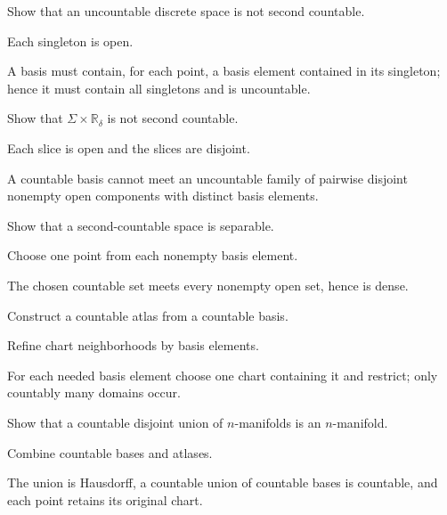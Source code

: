 \begin{exercise}\label{exr:vii01-09}
Show that an uncountable discrete space is not second countable.
\end{exercise}
\begin{hint}
Each singleton is open.
\end{hint}
\begin{solution}A basis must contain, for each point, a basis element contained in its singleton; hence it must contain all singletons and is uncountable.\end{solution}

\begin{exercise}\label{exr:vii01-10}
Show that \(\Sigma\times\mathbb R_\delta\) is not second countable.
\end{exercise}
\begin{hint}
Each slice is open and the slices are disjoint.
\end{hint}
\begin{solution}A countable basis cannot meet an uncountable family of pairwise disjoint nonempty open components with distinct basis elements.\end{solution}

\begin{exercise}\label{exr:vii01-11}
Show that a second-countable space is separable.
\end{exercise}
\begin{hint}
Choose one point from each nonempty basis element.
\end{hint}
\begin{solution}The chosen countable set meets every nonempty open set, hence is dense.\end{solution}

\begin{exercise}\label{exr:vii01-12}
Construct a countable atlas from a countable basis.
\end{exercise}
\begin{hint}
Refine chart neighborhoods by basis elements.
\end{hint}
\begin{solution}For each needed basis element choose one chart containing it and restrict; only countably many domains occur.\end{solution}

\begin{exercise}\label{exr:vii01-13}
Show that a countable disjoint union of \(n\)-manifolds is an \(n\)-manifold.
\end{exercise}
\begin{hint}
Combine countable bases and atlases.
\end{hint}
\begin{solution}The union is Hausdorff, a countable union of countable bases is countable, and each point retains its original chart.\end{solution}

